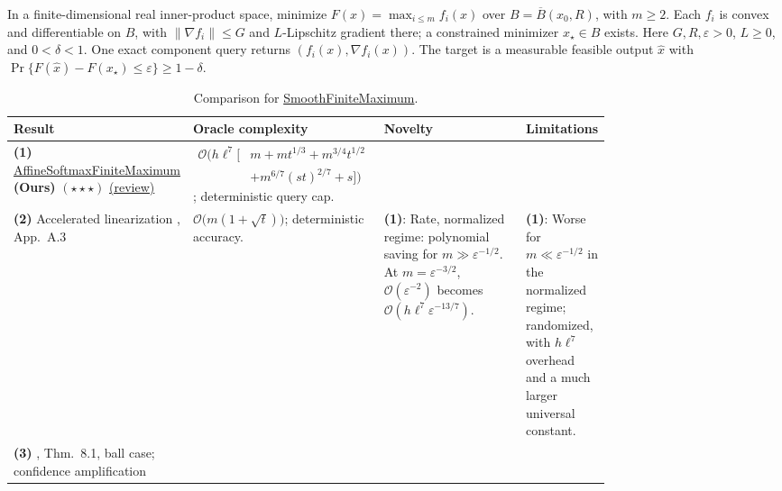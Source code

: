 \begin{table}[tp]
\centering
\caption{Comparison for \href{https://github.com/k3nfalt/longtails/blob/main/LongTails/Setups/SmoothFiniteMaximum.lean}{SmoothFiniteMaximum}.}\label{tab:SmoothFiniteMaximum}
\parbox{\linewidth}{\footnotesize In a finite-dimensional real inner-product space, minimize $F(x)=\max_{i\le m}f_i(x)$ over $B=\overline B(x_0,R)$, with $m\ge2$. Each $f_i$ is convex and differentiable on $B$, with $\|\nabla f_i\|\le G$ and $L$-Lipschitz gradient there; a constrained minimizer $x_\star\in B$ exists. Here $G,R,\varepsilon>0$, $L\ge0$, and $0<\delta<1$. One exact component query returns $(f_i(x),\nabla f_i(x))$. The target is a measurable feasible output $\widehat x$ with $\Pr\{F(\widehat x)-F(x_\star)\le\varepsilon\}\ge1-\delta$.}\par\smallskip
\begin{threeparttable}
\footnotesize
\setlength{\tabcolsep}{4pt}\renewcommand{\arraystretch}{1.25}
\begin{tabularx}{\linewidth}{@{}>{\raggedright\arraybackslash}p{0.20\linewidth}>{\raggedright\arraybackslash}p{0.32\linewidth}>{\raggedright\arraybackslash}p{0.25\linewidth}>{\raggedright\arraybackslash}X@{}}
\toprule
\textbf{Result} & \textbf{Oracle complexity} & \textbf{Novelty} & \textbf{Limitations} \\
\midrule
\textbf{(1)} \href{https://github.com/k3nfalt/longtails/blob/main/LongTails/Theorems/AffineSoftmaxFiniteMaximum.lean}{Affine\allowbreak Softmax\allowbreak Finite\allowbreak Maximum} \textbf{(Ours)} $(\star\star\star)$ \href{https://github.com/k3nfalt/longtails/blob/main/scripts/reviews/AffineSoftmaxFiniteMaximum.md}{(review)}
& $\begin{aligned}\mathcal{O}\bigl(h\ell^7[&m+mt^{1/3}+m^{3/4}t^{1/2}\\&+m^{6/7}(st)^{2/7}+s]\bigr)\end{aligned}$; deterministic query cap.
& & \\
\midrule[1.2pt]
\textbf{(2)} Accelerated linearization \citep{sfmCarmon2021v1}, App.~A.3
& $\mathcal{O}\bigl(m(1+\sqrt t)\bigr)$; deterministic accuracy.
& \textbf{(1)}: Rate, normalized regime: polynomial saving for $m\gg\varepsilon^{-1/2}$. At $m=\varepsilon^{-3/2}$, $\mathcal{O}(\varepsilon^{-2})$ becomes $\mathcal{O}(h\ell^7\varepsilon^{-13/7})$.
& \textbf{(1)}: Worse for $m\ll\varepsilon^{-1/2}$ in the normalized regime; randomized, with $h\ell^7$ overhead and a much larger universal constant. \\
\midrule
\textbf{(3)} \citep{sfmCarmon2023v1}, Thm.~8.1, ball case; confidence amplification

\end{tabularx}
\end{threeparttable}
\end{table}
